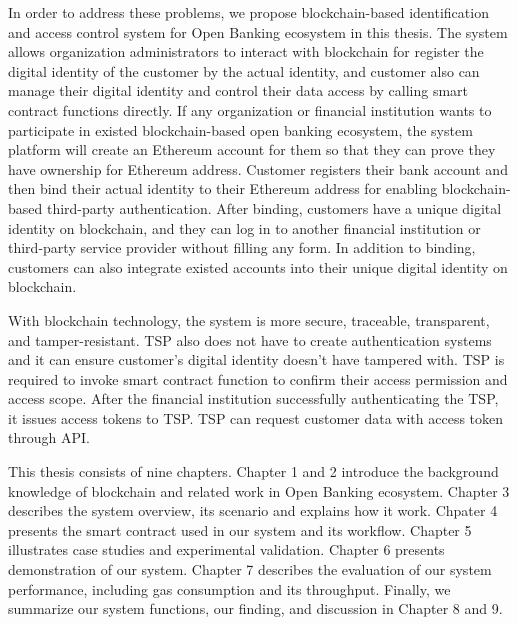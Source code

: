 In order to address these problems, we propose blockchain-based identification and access control system for Open Banking ecosystem in this thesis. The system allows organization administrators to interact with blockchain for register the digital identity of the customer by the actual identity, and customer also can manage their digital identity and control their data access by calling smart contract functions directly. If any organization or financial institution wants to participate in existed blockchain-based open banking ecosystem, the system platform will create an Ethereum account for them so that they can prove they have ownership for Ethereum address. Customer registers their bank account and then bind their actual identity to their Ethereum address for enabling blockchain-based third-party authentication. After binding, customers have a unique digital identity on blockchain, and they can log in to another financial institution or third-party service provider without filling any form. In addition to binding, customers can also integrate existed accounts into their unique digital identity on blockchain.\par
With blockchain technology, the system is more secure, traceable, transparent, and tamper-resistant. TSP also does not have to create authentication systems and it can ensure customer's digital identity doesn't have tampered with. TSP is required to invoke smart contract function to confirm their access permission and access scope. After the financial institution successfully authenticating the TSP, it issues access tokens to TSP. TSP can request customer data with access token through API.\par
This thesis consists of nine chapters. Chapter 1 and 2 introduce the background knowledge of blockchain and related work in Open Banking ecosystem. Chapter 3 describes the system overview, its scenario and explains how it work. Chpater 4 presents the smart contract used in our system and its workflow. Chapter 5 illustrates case studies and experimental validation. Chapter 6 presents demonstration of our system. Chapter 7 describes the evaluation of our system performance, including gas consumption and its throughput. Finally, we summarize our system functions, our finding, and discussion in Chapter 8 and 9.\par